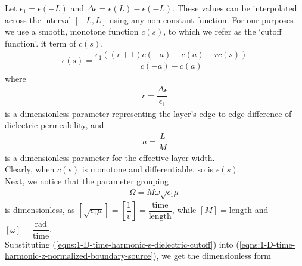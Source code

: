 \documentclass[12pt,twoside]{report}
\begin{document}
Let $\epsilon_1 = \epsilon(-L)$ and $\Delta \epsilon = \epsilon(L)-\epsilon(-L)$. These values can be interpolated across the interval $[-L,L]$ using any non-constant function. For our purposes we use a smooth, monotone function $c(s)$, to which we refer as the `cutoff function'. it term of $c(s)$, 
\begin{align}
\label{eqns:1-D-time-harmonic-s-dielectric-cutoff}
\epsilon(s) = \dfrac{\epsilon_1 ((r+1) c(-a)-c(a)-r c(s))}{c(-a)-c(a)}
\end{align}
where 
\begin{align}
r = \dfrac{\Delta \epsilon}{\epsilon_1}
\end{align} 
is a dimensionless parameter representing the layer's edge-to-edge difference of dielectric permeability, and
\begin{align}
a = \dfrac{L}{M}
\end{align} 
is a dimensionless parameter for the effective layer width.\\
Clearly, when $c(s)$ is monotone and differentiable, so is $\epsilon(s)$.\\


Next, we notice that the parameter grouping  
\begin{align}
\label{eqns:1_D-time-harmonic-normalized-freq}
\Omega = M \omega \sqrt{\epsilon_1 \mu}
\end{align}
is dimensionless, as $[\sqrt{\epsilon_1 \mu}] = \left[ \dfrac{1}{v}\right] = \dfrac{\text{time}}{\text{length}}$, while $[M] = \text{length}$ and $[\omega] = \dfrac{\text{rad}}{\text{time}}$. \\


Substituting (\ref{eqns:1-D-time-harmonic-s-dielectric-cutoff}) into (\ref{eqns:1-D-time-harmonic-z-normalized-boundary-source}), we get the dimensionless form 
\end{document}

